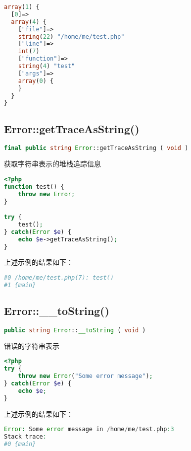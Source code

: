 \begin{lstlisting}[language=PHP]
array(1) {
  [0]=>
  array(4) {
    ["file"]=>
    string(22) "/home/me/test.php"
    ["line"]=>
    int(7)
    ["function"]=>
    string(4) "test"
    ["args"]=>
    array(0) {
    }
  }
}
\end{lstlisting}

\subsection{Error::getTraceAsString()}

\begin{lstlisting}[language=PHP]
final public string Error::getTraceAsString ( void )
\end{lstlisting}

获取字符串表示的堆栈追踪信息



\begin{lstlisting}[language=PHP]
<?php
function test() {
    throw new Error;
}

try {
    test();
} catch(Error $e) {
    echo $e->getTraceAsString();
}
\end{lstlisting}





上述示例的结果如下：

\begin{lstlisting}[language=PHP]
#0 /home/me/test.php(7): test()
#1 {main}
\end{lstlisting}

\subsection{Error::\_\_toString()}

\begin{lstlisting}[language=PHP]
public string Error::__toString ( void )
\end{lstlisting}


错误的字符串表示


\begin{lstlisting}[language=PHP]
<?php
try {
    throw new Error("Some error message");
} catch(Error $e) {
    echo $e;
}
\end{lstlisting}

上述示例的结果如下：

\begin{lstlisting}[language=PHP]
Error: Some error message in /home/me/test.php:3
Stack trace:
#0 {main}
\end{lstlisting}

